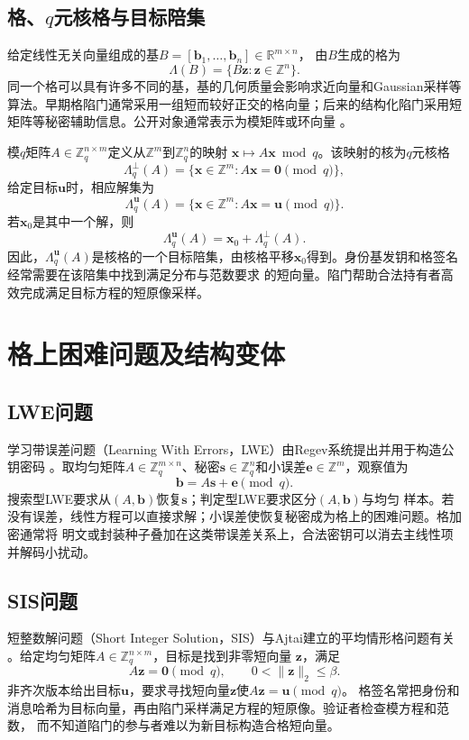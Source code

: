 \subsection{格、$q$元核格与目标陪集}

给定线性无关向量组成的基$B=[\mathbf b_1,\ldots,\mathbf b_n]\in\mathbb R^{m\times n}$，
由$B$生成的格为
\[
  \Lambda(B)=\{B\mathbf z:\mathbf z\in\mathbb Z^n\}.
\]
同一个格可以具有许多不同的基，基的几何质量会影响求近向量和Gaussian采样等算法。早期格陷门通常采用一组短而较好正交的格向量；后来的结构化陷门采用短矩阵等秘密辅助信息。公开对象通常表示为模矩阵或环向量
\cite{gpv2008,micciancio2012trapdoors}。

模$q$矩阵$A\in\mathbb Z_q^{n\times m}$定义从$\mathbb Z^m$到$\mathbb Z_q^n$的映射
$\mathbf x\mapsto A\mathbf x\bmod q$。该映射的核为$q$元核格
\[
 \Lambda_q^\perp(A)=\{\mathbf x\in\mathbb Z^m:A\mathbf x=\mathbf0\pmod q\},
\]
给定目标$\mathbf u$时，相应解集为
\[
 \Lambda_q^{\mathbf u}(A)=\{\mathbf x\in\mathbb Z^m:A\mathbf x=\mathbf u\pmod q\}.
\]
若$\mathbf x_0$是其中一个解，则
\[
 \Lambda_q^{\mathbf u}(A)=\mathbf x_0+\Lambda_q^\perp(A).
\]
因此，$\Lambda_q^{\mathbf u}(A)$是核格的一个目标陪集，由核格平移$\mathbf x_0$得到。身份基发钥和格签名经常需要在该陪集中找到满足分布与范数要求
的短向量。陷门帮助合法持有者高效完成满足目标方程的短原像采样。

\section{格上困难问题及结构变体}

\subsection{LWE问题}

学习带误差问题（Learning With Errors，LWE）由Regev系统提出并用于构造公钥密码
\cite{regev2005lwe}。取均匀矩阵$A\in\mathbb Z_q^{m\times n}$、秘密$\mathbf s\in\mathbb
Z_q^n$和小误差$\mathbf e\in\mathbb Z^m$，观察值为
\[
  \mathbf b=A\mathbf s+\mathbf e\pmod q.
\]
搜索型LWE要求从$(A,\mathbf b)$恢复$\mathbf s$；判定型LWE要求区分$(A,\mathbf b)$与均匀
样本。若没有误差，线性方程可以直接求解；小误差使恢复秘密成为格上的困难问题。格加密通常将
明文或封装种子叠加在这类带误差关系上，合法密钥可以消去主线性项并解码小扰动。

\subsection{SIS问题}

短整数解问题（Short Integer Solution，SIS）与Ajtai建立的平均情形格问题有关
\cite{ajtai1996}。给定均匀矩阵$A\in\mathbb Z_q^{n\times m}$，目标是找到非零短向量
$\mathbf z$，满足
\[
 A\mathbf z=\mathbf0\pmod q,
 \qquad 0<\lVert\mathbf z\rVert_2\leq\beta.
\]
非齐次版本给出目标$\mathbf u$，要求寻找短向量$\mathbf z$使$A\mathbf z=\mathbf u\pmod q$。
格签名常把身份和消息哈希为目标向量，再由陷门采样满足方程的短原像。验证者检查模方程和范数，
而不知道陷门的参与者难以为新目标构造合格短向量。


